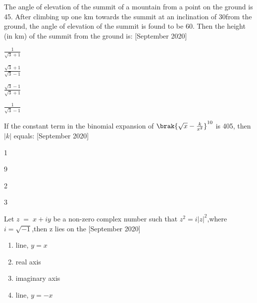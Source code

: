 \iffalse
\title{2020}
\author{EE24BTECH11063}
\section{mcq-single}
\fi
\item The angle of elevation of the summit of a mountain from a point on the ground is 45\degree . After climbing up one km towards the summit at an inclination of 30\degree from the ground, the angle of elevation of the summit is found to be 60\degree. Then the height (in km) of the summit from the ground is:  \hfill{[September 2020]}
    \begin{enumerate}
    
        
    \begin{multicols}{2}
        \item $\frac{1}{\sqrt{3}+1}$
        \columnbreak
        \item $\frac{\sqrt{3}+1}{\sqrt{3}-1}$
        \end{multicols}
        \begin{multicols}{2}
        \item $\frac{\sqrt{3}-1}{\sqrt{3}+1}$
        \item $\frac{1}{\sqrt{3}-1}$
        \end{multicols}
        \end{enumerate}
        \item If the constant term in the binomial expansion of $\brak{\sqrt{x}-\frac{k}{x^2}}^{10}$ is 405, then $|k|$ equals: \hfill{[September 2020]}
        \begin{enumerate}
        \begin{multicols}{4}
            \item 1
            \item 9
            \item 2
            \item 3
            \end{multicols}
        \end{enumerate}
\item Let $z\;=\;x+iy$ be a non-zero complex number such that $z^2=i|z|^2$,where $i=\sqrt{-1}$,then z lies on the \hfill{[September 2020]}
        \begin{enumerate}
        \item line, $y=x$
        \item real axis
        \item imaginary axis
        \item line, $y=-x$
        \end{enumerate}
